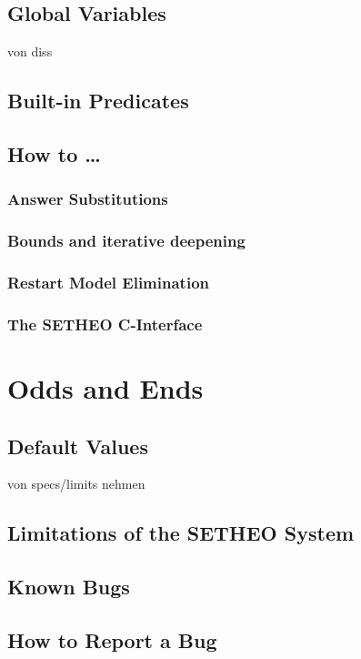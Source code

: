 \section{Global Variables}
von diss
\section{Built-in Predicates}



\section{How to \ldots}

\subsection{Answer Substitutions}
\subsection{Bounds and iterative deepening}
\subsection{Restart Model Elimination}

\subsection{The SETHEO C-Interface}


\chapter{Odds and Ends}
\section{Default Values}
von specs/limits nehmen
\section{Limitations of the SETHEO System}


\section{Known Bugs}
\section{How to Report a Bug}

